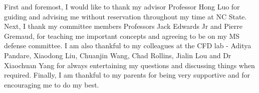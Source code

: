 \begin{acknowledgements}
First and foremost, I would like to thank my advisor Professor Hong Luo for guiding and advising me without reservation throughout my time at NC State. Next, I thank my committee members Professors Jack Edwards Jr and Pierre Gremaud, for teaching me important concepts and agreeing to be on my MS defense committee. I am also thankful to my colleagues at the CFD lab - Aditya Pandare, Xiaodong Liu, Chuanjin Wang, Chad Rollins, Jialin Lou and Dr Xiaochuan Yang for always entertaining my questions and discussing things when required. Finally, I am thankful to my parents for being very supportive and for encouraging me to do my best.
\end{acknowledgements}


\thesistableofcontents

\thesislistoftables

\thesislistoffigures
